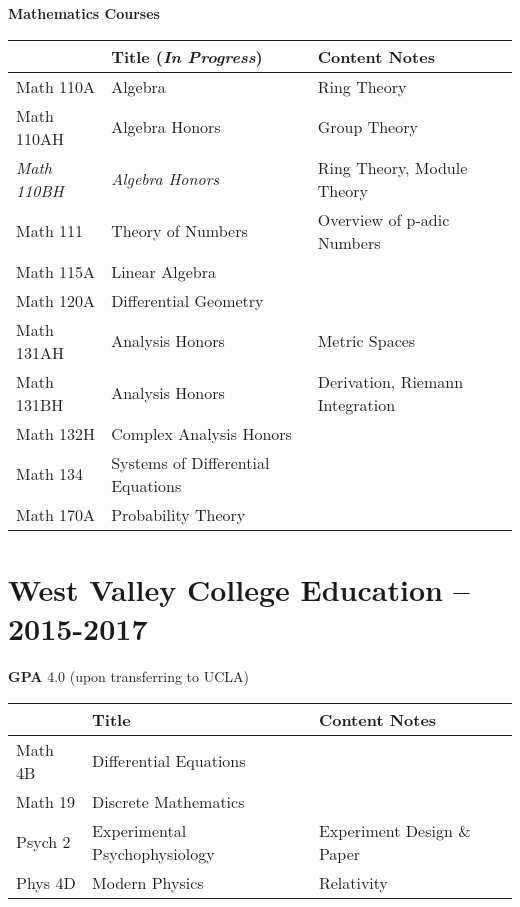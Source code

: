 \documentclass[11pt]{article}
\begin{document}
\newpage
\textbf{Mathematics Courses}

\begin{tabular}{|l l l|}
\hline
 & Title (\textit{In Progress}) & Content Notes \\
\hline
Math 110A & Algebra & Ring Theory \\
Math 110AH & Algebra Honors & Group Theory \\
\textit{Math 110BH} & \textit{Algebra Honors} & Ring Theory, Module Theory \\
Math 111 & Theory of Numbers & Overview of p-adic Numbers \\
Math 115A & Linear Algebra & \\
Math 120A & Differential Geometry & \\
Math 131AH & Analysis Honors & Metric Spaces \\
Math 131BH & Analysis Honors & Derivation, Riemann Integration \\
Math 132H & Complex Analysis Honors & \\
Math 134 & Systems of Differential Equations & \\
Math 170A & Probability Theory & \\
\hline
\end{tabular}

\section{West Valley College Education -- 2015-2017}

\textbf{GPA} 4.0 (upon transferring to UCLA)

\begin{tabular}{|l l l|}
\hline
 & Title & Content Notes \\
\hline
Math 4B & Differential Equations & \\
Math 19 & Discrete Mathematics & \\
Psych 2 & Experimental Psychophysiology & Experiment Design \& Paper \\
Phys 4D & Modern Physics & Relativity \\
\hline
\end{tabular}
\end{document}
